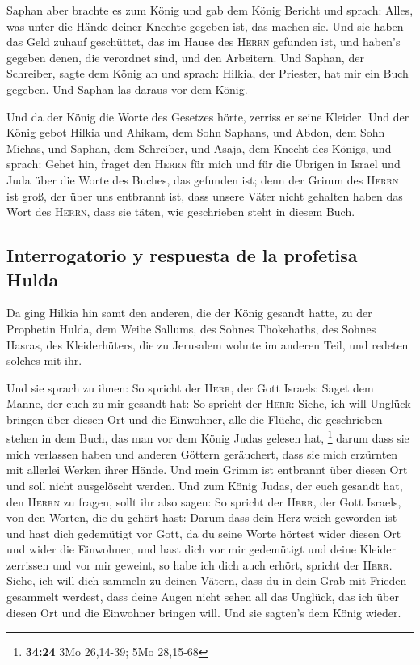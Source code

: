  Saphan aber brachte es zum König und gab dem König
Bericht und sprach: Alles, was unter die Hände deiner Knechte gegeben
ist, das machen sie.  Und sie haben das Geld zuhauf
geschüttet, das im Hause des \textsc{Herrn} gefunden ist, und haben's
gegeben denen, die verordnet sind, und den Arbeitern. 
Und Saphan, der Schreiber, sagte dem König an und sprach: Hilkia, der
Priester, hat mir ein Buch gegeben. Und Saphan las daraus vor dem König.

 Und da der König die Worte des Gesetzes hörte, zerriss
er seine Kleider.  Und der König gebot Hilkia und Ahikam,
dem Sohn Saphans, und Abdon, dem Sohn Michas, und Saphan, dem Schreiber,
und Asaja, dem Knecht des Königs, und sprach:  Gehet hin,
fraget den \textsc{Herrn} für mich und für die Übrigen in Israel und
Juda über die Worte des Buches, das gefunden ist; denn der Grimm des
\textsc{Herrn} ist groß, der über uns entbrannt ist, dass unsere Väter
nicht gehalten haben das Wort des \textsc{Herrn}, dass sie täten, wie
geschrieben steht in diesem Buch.

\hypertarget{interrogatorio-y-respuesta-de-la-profetisa-hulda}{%
\subsection{Interrogatorio y respuesta de la profetisa
Hulda}\label{interrogatorio-y-respuesta-de-la-profetisa-hulda}}

 Da ging Hilkia hin samt den anderen, die der König
gesandt hatte, zu der Prophetin Hulda, dem Weibe Sallums, des Sohnes
Thokehaths, des Sohnes Hasras, des Kleiderhüters, die zu Jerusalem
wohnte im anderen Teil, und redeten solches mit ihr.

 Und sie sprach zu ihnen: So spricht der \textsc{Herr},
der Gott Israels: Saget dem Manne, der euch zu mir gesandt hat:
 So spricht der \textsc{Herr}: Siehe, ich will Unglück
bringen über diesen Ort und die Einwohner, alle die Flüche, die
geschrieben stehen in dem Buch, das man vor dem König Judas gelesen hat,
\footnote{\textbf{34:24} 3Mo 26,14-39; 5Mo 28,15-68} 
darum dass sie mich verlassen haben und anderen Göttern geräuchert, dass
sie mich erzürnten mit allerlei Werken ihrer Hände. Und mein Grimm ist
entbrannt über diesen Ort und soll nicht ausgelöscht werden.
 Und zum König Judas, der euch gesandt hat, den
\textsc{Herrn} zu fragen, sollt ihr also sagen: So spricht der
\textsc{Herr}, der Gott Israels, von den Worten, die du gehört hast:
 Darum dass dein Herz weich geworden ist und hast dich
gedemütigt vor Gott, da du seine Worte hörtest wider diesen Ort und
wider die Einwohner, und hast dich vor mir gedemütigt und deine Kleider
zerrissen und vor mir geweint, so habe ich dich auch erhört, spricht der
\textsc{Herr}.  Siehe, ich will dich sammeln zu deinen
Vätern, dass du in dein Grab mit Frieden gesammelt werdest, dass deine
Augen nicht sehen all das Unglück, das ich über diesen Ort und die
Einwohner bringen will. Und sie sagten's dem König wieder.


